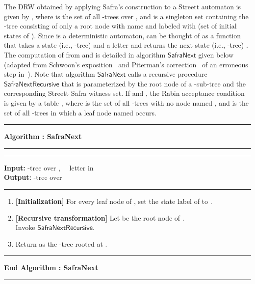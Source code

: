 \documentclass[3p]{elsarticle}
\newcommand{\algo}[1]{\ensuremath{\textsf{{#1}}}}
\newcommand{\algoblock}[4]{{{{
                                     \vspace{5mm}
                                     \hrule 
				     \vspace{2mm} 
                                     \noindent \textsf{\bfseries Algorithm : {#1}}
				     \vspace{2mm} 
                                     \hrule 
				     \vspace{2mm}
                                     \hrule 
				     \vspace{2mm}
                                     \noindent \textsf{ {\bfseries Input:} {#2}}\\
                                     \noindent \textsf{ {\bfseries Output:} {#3}}
				     \vspace{2mm}
				     \hrule
				     \vspace{2mm}
{#4} 
				     \vspace{2mm}
				     \hrule
				     \vspace{2mm}
                                     \noindent \textsf{\bfseries End Algorithm : {#1}}}
				     \vspace{2mm}
                                     \hrule 
				     \vspace{2mm}
                          }}
                         }
\begin{document}
The DRW obtained by applying Safra's construction to a Streett
automaton  is given by , where  is the set of all
-trees over , and  is a singleton set containing
the -tree consisting of only a root node with name  and
labeled with  (set of initial states of ).  Since  is a
deterministic automaton,  can be thought of as a function
that takes a state (i.e., -tree)  and a letter  and returns the next state (i.e., -tree) .  The
computation of  from  and  is detailed in algorithm
\algo{SafraNext} given below (adapted from Schwoon's
exposition~\cite{2001automata} and Piterman's
correction~\cite{piterman} of an erroneous step
in~\cite{safra06,2001automata}).  Note that algorithm \algo{SafraNext}
calls a recursive procedure \algo{SafraNextRecursive} that is
parameterized by the root node of a -sub-tree and the
corresponding Streett Safra witness set.  If  and ,
the Rabin acceptance condition  is given by a table
, where  is the set of all -trees with no
node named , and  is the set of all -trees in
which a leaf node named  occurs.


\algoblock{SafraNext}
{ -tree over ,~~  letter in }
{ -tree over } 
{
  \begin{enumerate}
  \item {\bfseries [Initialization]} For every leaf node  of ,
    set the state label of  to .
    
  \item {\bfseries [Recursive transformation]} Let  be
    the root node of .  \\Invoke 
    \algo{SafraNextRecursive}.

  \item Return  as the -tree rooted at .
\end{enumerate}
}
\end{document}
